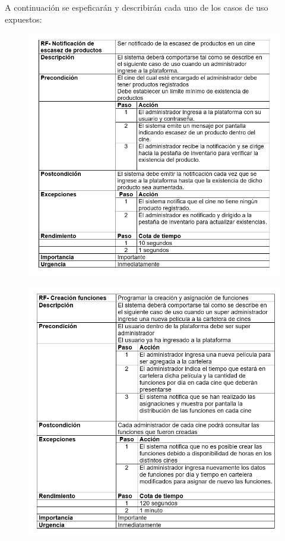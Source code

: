 A continuación se espeficarán y describirán cada uno de los casos de uso expuestos:
\begin{figure}[h!]
\centering
\includegraphics[width=.8\linewidth]{diseno/requerimientos/imgs/casos1}
\end{figure}

\begin{figure}[h!]
	\centering
\includegraphics[width=.8\linewidth]{diseno/requerimientos/imgs/casos2}
\end{figure}